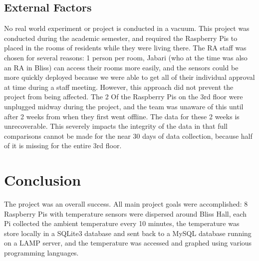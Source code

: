 \documentclass{article}
\begin{document}
		\subsection{External Factors}
			No real world experiment or project is conducted in a vacuum. This project was conducted during the academic semester, and required the 
			Raspberry Pis to placed in the rooms of residents while they were living there. The RA staff was chosen for several reasons: 1 person per room,
			Jabari (who at the time was also an RA in Bliss) can access their rooms more easily, and the sensors could be more quickly deployed because
			we were able to get all of their individual approval at time during a staff meeting. However, this approach did not prevent the project from
			being affected. The 2 Of the Raspberry Pis on the 3rd floor were unplugged midway during the project, and the team was unaware of this until after 
			2 weeks from when they first went offline. The data for these 2 weeks is unrecoverable. This severely impacts the integrity of the data in 
			that full comparisons cannot be made for the near 30 days of data collection, because half of it is missing for the entire 3rd floor. 
			
	\section{Conclusion}\label{sec:conclusion}
		The project was an overall success. All main project goals were accomplished: 8 Raspberry Pis with temperature sensors were dispersed
		around Bliss Hall, each Pi collected the ambient temperature every 10 minutes, the temperature was store locally in a SQLite3 database
		and sent back to a MySQL database running on a LAMP server, and the temperature was accessed and graphed using various programming languages.
\end{document}
